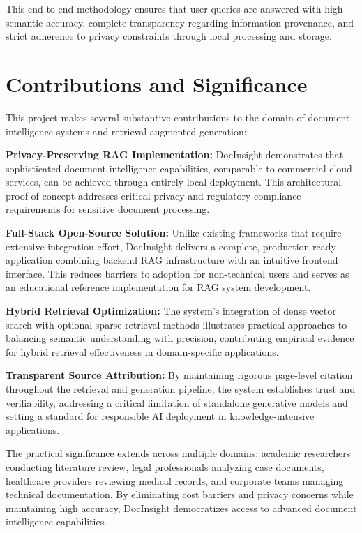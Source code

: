 This end-to-end methodology ensures that user queries are answered with high semantic accuracy, complete transparency regarding information provenance, and strict adherence to privacy constraints through local processing and storage.

\section{Contributions and Significance}

This project makes several substantive contributions to the domain of document intelligence systems and retrieval-augmented generation:

\textbf{Privacy-Preserving RAG Implementation:} DocInsight demonstrates that sophisticated document intelligence capabilities, comparable to commercial cloud services, can be achieved through entirely local deployment. This architectural proof-of-concept addresses critical privacy and regulatory compliance requirements for sensitive document processing.

\textbf{Full-Stack Open-Source Solution:} Unlike existing frameworks that require extensive integration effort, DocInsight delivers a complete, production-ready application combining backend RAG infrastructure with an intuitive frontend interface. This reduces barriers to adoption for non-technical users and serves as an educational reference implementation for RAG system development.

\textbf{Hybrid Retrieval Optimization:} The system's integration of dense vector search with optional sparse retrieval methods illustrates practical approaches to balancing semantic understanding with precision, contributing empirical evidence for hybrid retrieval effectiveness in domain-specific applications.

\textbf{Transparent Source Attribution:} By maintaining rigorous page-level citation throughout the retrieval and generation pipeline, the system establishes trust and verifiability, addressing a critical limitation of standalone generative models and setting a standard for responsible AI deployment in knowledge-intensive applications.

The practical significance extends across multiple domains: academic researchers conducting literature review, legal professionals analyzing case documents, healthcare providers reviewing medical records, and corporate teams managing technical documentation. By eliminating cost barriers and privacy concerns while maintaining high accuracy, DocInsight democratizes access to advanced document intelligence capabilities.

